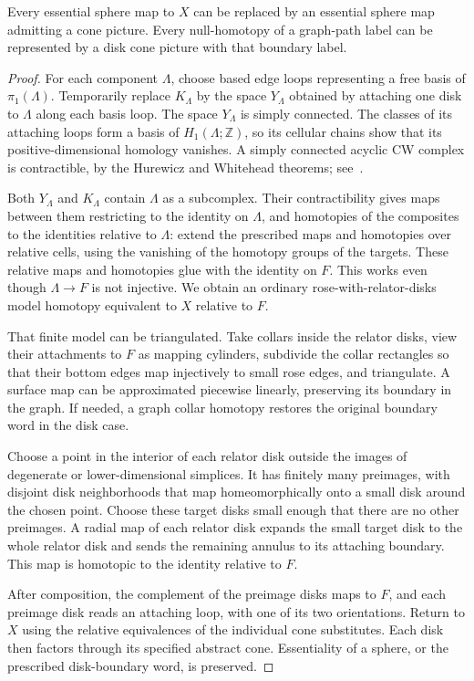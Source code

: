 \begin{lemma}\label{lem:pictures}
Every essential sphere map to \(X\) can be replaced by an essential sphere map admitting a cone picture. Every null-homotopy of a graph-path label can be represented by a disk cone picture with that boundary label.
\end{lemma}
\begin{proof}
For each component \(\Lambda\), choose based edge loops representing a free basis of \(\pi_1(\Lambda)\). Temporarily replace \(K_\Lambda\) by the space \(Y_\Lambda\) obtained by attaching one disk to \(\Lambda\) along each basis loop. The space \(Y_\Lambda\) is simply connected. The classes of its attaching loops form a basis of \(H_1(\Lambda;\mathbb Z)\), so its cellular chains show that its positive-dimensional homology vanishes. A simply connected acyclic CW complex is contractible, by the Hurewicz and Whitehead theorems; see~\cite[Theorem~4.32 and Corollary~4.33]{Hatcher2002}.

Both \(Y_\Lambda\) and \(K_\Lambda\) contain \(\Lambda\) as a subcomplex. Their contractibility gives maps between them restricting to the identity on \(\Lambda\), and homotopies of the composites to the identities relative to \(\Lambda\): extend the prescribed maps and homotopies over relative cells, using the vanishing of the homotopy groups of the targets. These relative maps and homotopies glue with the identity on \(F\). This works even though \(\Lambda\to F\) is not injective. We obtain an ordinary rose-with-relator-disks model homotopy equivalent to \(X\) relative to \(F\).

That finite model can be triangulated. Take collars inside the relator disks, view their attachments to \(F\) as mapping cylinders, subdivide the collar rectangles so that their bottom edges map injectively to small rose edges, and triangulate. A surface map can be approximated piecewise linearly, preserving its boundary in the graph. If needed, a graph collar homotopy restores the original boundary word in the disk case.

Choose a point in the interior of each relator disk outside the images of degenerate or lower-dimensional simplices. It has finitely many preimages, with disjoint disk neighborhoods that map homeomorphically onto a small disk around the chosen point. Choose these target disks small enough that there are no other preimages. A radial map of each relator disk expands the small target disk to the whole relator disk and sends the remaining annulus to its attaching boundary. This map is homotopic to the identity relative to \(F\).

After composition, the complement of the preimage disks maps to \(F\), and each preimage disk reads an attaching loop, with one of its two orientations. Return to \(X\) using the relative equivalences of the individual cone substitutes. Each disk then factors through its specified abstract cone. Essentiality of a sphere, or the prescribed disk-boundary word, is preserved.
\end{proof}

